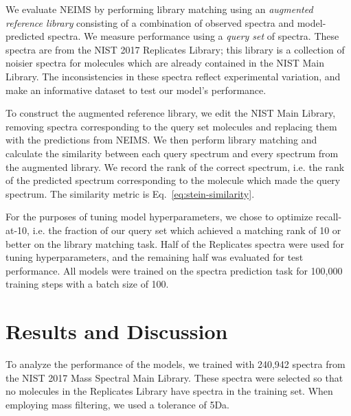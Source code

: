 \documentclass{article}
\begin{document}
We evaluate NEIMS by performing library matching using an \textit{augmented reference library} consisting of a combination of observed spectra and model-predicted spectra. We measure performance using a \textit{query set} of spectra. These spectra are from the NIST 2017 Replicates Library; this library is a collection of noisier spectra for molecules which are already contained in the NIST Main Library. The inconsistencies in these spectra reflect experimental variation, and make an informative dataset to test our model's performance.

To construct the augmented reference library, we edit the NIST Main Library, removing spectra corresponding to the query set molecules and replacing them with the predictions from NEIMS. 
We then perform library matching and calculate the similarity between each query spectrum and every spectrum from the augmented library. We record the rank of the correct spectrum, i.e. the rank of the predicted spectrum corresponding to the molecule which made the query spectrum. The similarity metric is Eq.~\eqref{eq:stein-similarity}.

For the purposes of tuning model hyperparameters, we chose to optimize recall-at-10, i.e. the fraction of our query set which achieved a matching rank of 10 or better on the library matching task. Half of the Replicates spectra were used for tuning hyperparameters, and the remaining half was evaluated for test performance. All models were trained on the spectra prediction task for 100,000 training steps with a batch size of 100.

\section{Results and Discussion}
To analyze the performance of the models, we trained with 240,942 spectra from the NIST 2017 Mass Spectral Main Library. These spectra were selected so that no molecules in the Replicates Library have spectra in the training set. When employing mass filtering, we used a tolerance of 5Da. 
\end{document}
